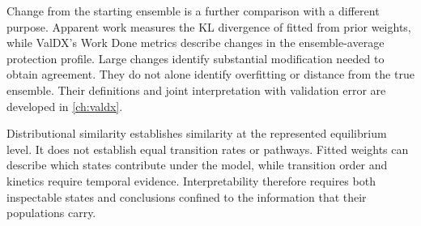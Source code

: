 Change from the starting ensemble is a further comparison with a different purpose. Apparent work measures the KL divergence of fitted from prior weights, while ValDX's Work Done metrics describe changes in the ensemble-average protection profile.\supercite{bradshawInterpretationHDXData2020,siddiquiFrameworkTestingStructural2026} Large changes identify substantial modification needed to obtain agreement. They do not alone identify overfitting or distance from the true ensemble. Their definitions and joint interpretation with validation error are developed in \cref{ch:valdx}.

Distributional similarity establishes similarity at the represented equilibrium level. It does not establish equal transition rates or pathways.\supercite{tibertiENCORESoftwareQuantitative2015} Fitted weights can describe which states contribute under the model, while transition order and kinetics require temporal evidence. Interpretability therefore requires both inspectable states and conclusions confined to the information that their populations carry.
